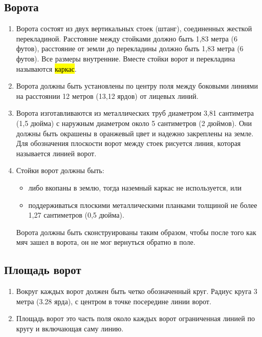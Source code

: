 \documentclass[../main.tex]{subfiles}
\begin{document}
\subsection{Ворота}
\begin{enumerate}
\item Ворота состоят из двух вертикальных стоек (штанг), соединенных жесткой перекладиной.\newline
Расстояние между стойками должно быть 1,83 метра (6 футов), расстояние от земли до перекладины должно быть 1,83 метра (6 футов). Все размеры внутренние.\newline
Вместе стойки ворот и перекладина называются {\hl{каркас}}.

\item Ворота должны быть установлены по центру поля между боковыми линиями на расстоянии 12 метров (13,12 ярдов) от лицевых линий.

\item Ворота изготавливаются из металлических труб диаметром 3,81 сантиметра (1,5 дюйма) с наружным диаметром около 5 сантиметров (2 дюймов).\newline
Они должны быть окрашены в оранжевый цвет и надежно закреплены на земле.\newline
Для обозначения плоскости ворот между стоек рисуется линия, которая называется линией ворот.

\item Стойки ворот должны быть:
\begin{itemize}
  \item либо вкопаны в землю, тогда наземный каркас не используется, или
  \item поддерживаться плоскими металлическими планками толщиной не более 1,27 сантиметров (0,5 дюйма).
\end{itemize}

Ворота должны быть сконструированы таким образом, чтобы после того как мяч зашел в ворота, он не мог вернуться обратно в поле.
\end{enumerate}

\subsection{Площадь ворот}
\begin{enumerate}
  \item Вокруг каждых ворот должен быть четко обозначенный круг.\newline
  Радиус круга 3 метра (3.28 ярда), с центром в точке посередине линии ворот.
  \item Площадь ворот это часть поля около каждых ворот ограниченная линией по кругу и включающая саму линию.
\end{enumerate}
\end{document}
